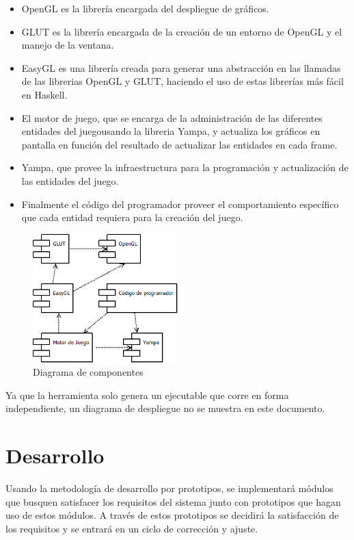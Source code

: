 \begin{itemize}
  \item OpenGL es la librería encargada del despliegue de gráficos.
  \item GLUT es la librería encargada de la creación de un entorno de OpenGL y el manejo de la ventana.
  \item EasyGL es una librería creada para generar una abstracción en las llamadas de las librerias OpenGL y GLUT, haciendo el uso de estas librerías más fácil en Haskell.
  \item El motor de juego, que se encarga de la administración de las diferentes entidades del juegousando la libreria Yampa, y actualiza los gráficos en pantalla en función del resultado de actualizar las entidades en cada frame.
  \item Yampa, que provee la infraestructura para la programación y actualización de las entidades del juego.
  \item Finalmente el código del programador proveer el comportamiento específico que cada entidad requiera para la creación del juego.
\end{itemize}

\begin{figure}[!htbp!]
\centering
\includegraphics[width=0.5\textwidth]{componentes}
\caption[Diagrama de componentes]{Diagrama de componentes}
\label{fig:componentes}
\end{figure}

Ya que la herramienta solo genera un ejecutable que corre en forma independiente, un diagrama de despliegue no se muestra en este documento.

\section{Desarrollo}

Usando la metodología de desarrollo por prototipos, se implementará módulos que busquen satisfacer los requisitos del sistema junto con prototipos que hagan uso de estos módulos. A través de estos prototipos se decidirá la satisfacción de los requisitos y se entrará en un ciclo de corrección y ajuste.

